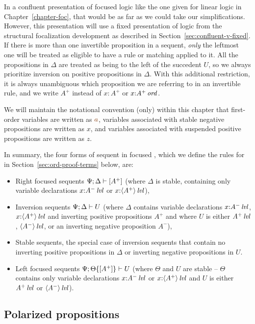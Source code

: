 In a confluent presentation of focused logic like the one given for
linear logic in Chapter~\ref{chapter-foc}, 
that would be as far as we could take our
simplifications. However, this presentation will use a fixed
presentation of logic from the structural focalization development
as described in Section~\ref{sec:confluent-v-fixed}. 
If there is more than one
invertible proposition in a sequent, {\it only} the leftmost one will
be treated as eligible to have a rule or matching applied to it. All the
propositions in $\Delta$ are treated as being to the left of the
succedent $U$, so we always prioritize inversion on positive
propositions in $\Delta$. With this additional restriction, it is
always unambiguous which proposition we are referring to in an
invertible rule, and we write $A^+$ instead of $x{:}A^+$ or
$x{:}{A^+}\,{{\it ord}}$.

We will maintain the notational convention (only) within this chapter that
first-order variables are written as $\lf{a}$, variables associated
with stable negative propositions are written as $x$, and variables
associated with suspended positive propositions are written as 
$z$. 

In summary,  the four forms of sequent in focused \ollll, which we define
the rules for in Section~\ref{sec:ord-proof-terms} below, are:
\smallskip
\begin{itemize}
\item Right focused sequents ${\Psi};{\Delta} \vdash {[A^+]} \mathstrut$ (where
  $\Delta$ is stable, containing only variable declarations
  $x{:}{A^-}\,{{\it lvl}}$ or $x{:}{\langle {A^+} \rangle}\,{{\it lvl}}$),
\item Inversion sequents ${\Psi};{\Delta} \vdash {U} \mathstrut$ (where $\Delta$ contains
  variable declarations $x{:}{A^-}\,{{\it lvl}}$, $x{:}{\langle {A^+} \rangle}\,{{\it lvl}}$ and
  inverting positive propositions $A^+$ and where $U$ is either 
  ${A^+}\,{{\it lvl}}$, ${\langle {A^-} \rangle}\,{{\it lvl}}$, or an inverting negative
  proposition $A^-$), 
\item Stable sequents, the special case of inversion sequents that
  contain no inverting positive propositions in $\Delta$ or inverting
  negative propositions in $U$.
\item Left focused sequents ${\Psi};{{\Theta}\{{[A^+]}\}} \vdash {U} \mathstrut$
  (where $\Theta$ and $U$ are stable -- $\Theta$ contains only
  variable declarations $x{:}{A^-}\,{{\it lvl}}$ or $x{:}{\langle {A^+} \rangle}\,{{\it lvl}}$ and
  $U$ is either ${A^+}\,{{\it lvl}}$ or ${\langle {A^-} \rangle}\,{{\it lvl}}$).
\end{itemize}


\subsection{Polarized propositions}
\label{sec:ordpolarprop}

